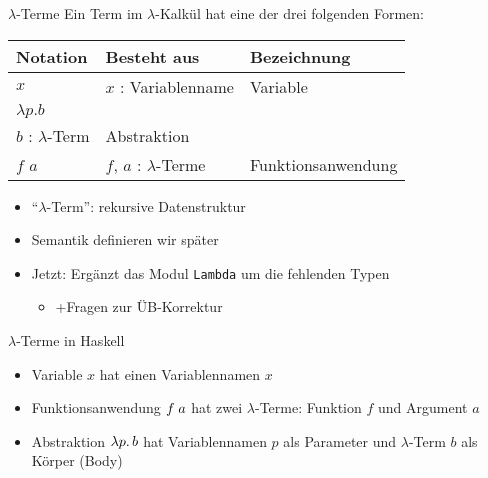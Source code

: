 \documentclass{beamer}
\begin{document}
\begin{frame}{$\lambda$-Terme}
	Ein Term im $\lambda$-Kalkül hat eine der drei folgenden Formen:

	\vspace{0.5cm}

	\begin{tabularx}{\textwidth}{ X | X | X }
		\textbf{Notation} & \textbf{Besteht aus}                      & \textbf{Bezeichnung} \\
		\hline
		$x$               & $x$ : Variablenname                       & Variable             \\
		\hline
		$\lambda{}p.b$    &
			\begin{tabular}[t]{@{}c@{}}$p$ : Variablenname\\$b$ : $\lambda$-Term\end{tabular}
									      & Abstraktion          \\
		\hline
		$f$ $a$           & $f$, $a$ : $\lambda$-Terme                & Funktionsanwendung   \\
	\end{tabularx}

	\vspace{0.5cm}

	\begin{itemize}
		\item \enquote{$\lambda$-Term}: rekursive Datenstruktur
		\item Semantik definieren wir später
		\pause
		\item Jetzt: Ergänzt das Modul \texttt{Lambda} um die fehlenden Typen
		\begin{itemize}
			\item +Fragen zur ÜB-Korrektur
		\end{itemize}
	\end{itemize}
\end{frame}

\begin{frame}{$\lambda$-Terme in Haskell}

    \begin{itemize}
        \item Variable $x$ hat einen Variablennamen $x$
        \item Funktionsanwendung $f\;a$ hat zwei $\lambda$-Terme: Funktion $f$ und Argument $a$
        \item Abstraktion $\lambda p.\, b$ hat Variablennamen $p$ als Parameter und $\lambda$-Term $b$ als Körper (Body)
    \end{itemize}
\end{frame}
\end{document}
